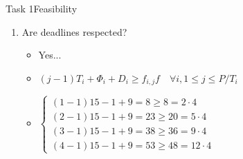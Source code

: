 \begin{frame}[allowframebreaks]{Task 1}{Feasibility\vspace{0.5cm}}
\begin{enumerate}
\begin{itemize}
        \item $\Phi_3=\min \left\{\begin{array}{l}(1-1) 4-(1-1) 10 \\ (3-1) 4-(2-1) 10 \\ (6-1) 4-(3-1) 10 \\ (8-1) 4-(4-1) 10 \\ (11-1) 4-(5-1) 10 \\ (13-1) 4-(6-1) 10\end{array} \quad=\min \left\{\begin{array}{l}0 \\ -2 \\ 0 \\ -2 \\ 0 \\ -2\end{array}\right.\right.$
        \item $\Phi_4=\min \left\{\begin{array}{l}(2-1) 4-(1-1) 6 \\ (3-1) 4-(2-1) 6 \\ (5-1) 4-(3-1) 6 \\ (6-1) 4-(4-1) 6 \\ (8-1) 4-(5-1) 6 \\ (11-1) 4-(7-1) 6 \\ (12-1) 4-(8-1) 6 \\ (14-1) 4-(9-1) 6 \\ (15-1) 4-(10-1) 6\end{array} \quad=\min \left\{\begin{array}{l}4 \\ 2 \\ 2 \\ 4 \\ 4 \\ 2 \\ 4 \\ 2\end{array}\right.\right.$
      \end{itemize}
    \item Are deadlines respected?
      \begin{itemize}
        \item Yes...
        \item $(j-1) T_i+\Phi_i+D_i \geq f_{i, j} f \quad \forall i, 1 \leq j \leq P / T_i$
        \item $\left\{\begin{array}{l}(1-1) 15-1+9=8 \geq 8=2 \cdot 4 \\ (2-1) 15-1+9=23 \geq 20=5 \cdot 4 \\ (3-1) 15-1+9=38 \geq 36=9 \cdot 4 \\ (4-1) 15-1+9=53 \geq 48=12 \cdot 4\end{array}\right.$

\end{itemize}
\end{enumerate}
\end{frame}
